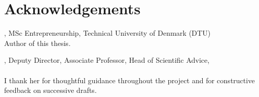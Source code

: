 \section*{Acknowledgements}

\noindent
\textbf{\thesisauthor}, MSc Entrepreneurship, Technical University of Denmark (DTU)\\
Author of this thesis.

\medskip
\noindent
\textbf{\thesissupervisor}, Deputy Director, Associate Professor, Head of Scientific Advice, \department\\
\\ I thank her for thoughtful guidance throughout the project and for
constructive feedback on successive drafts.

\medskip
\noindent

